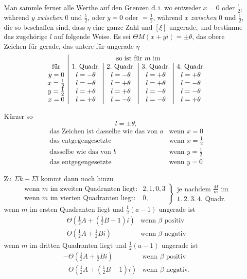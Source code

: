 Man sammle ferner alle Werthe auf den Grenzen d.\,i. wo entweder $x=0$ oder $\frac12$, während $y$ \emph{zwischen} $0$ und $\frac12$, oder $y=0$ oder $=\frac12$, während $x$ \emph{zwischen} $0$ und $\frac12$, die so beschaffen sind, dass $\eta$ eine ganze Zahl und $[\xi]$ ungerade, und bestimme das zugehörige $l$ auf folgende Weise. Es sei $\Theta M(x+yi)=\pm\theta$, das obere Zeichen für gerade, das untere für ungerade $\eta$
\[
\begin{array}{c|c|c|c|c}
&\multicolumn{4}{c}{\text{so ist für }m\text{ im}}\\
\text{für}&1.\text{ Quadr.}&2.\text{ Quadr.}&3.\text{ Quadr.}&4.\text{ Quadr.}\\
y=0&l=-\theta&l=-\theta&l=+\theta&l=+\theta\\
x=\frac12&l=-\theta&l=+\theta&l=+\theta&l=-\theta\\
y=\frac12&l=+\theta&l=+\theta&l=-\theta&l=-\theta\\
x=0&l=+\theta&l=-\theta&l=-\theta&l=+\theta
\end{array}
\]

Kürzer so
\[
l=\pm\theta,
\]
\[
\begin{array}{ll}
\text{das Zeichen ist dasselbe wie das von }a&\text{wenn }x=0\\
\text{das entgegengesetzte}&\text{wenn }x=\frac12\\
\text{dasselbe wie das von }b&\text{wenn }y=\frac12\\
\text{das entgegengesetzte}&\text{wenn }y=0
\end{array}
\]

Zu $\Sigma k+\Sigma l$ kommt dann noch hinzu
\[
\left.\begin{array}{ll}
\text{wenn }m\text{ im zweiten Quadranten liegt:}&2,1,0,3\\
\text{wenn }m\text{ im vierten Quadranten liegt:}&0,
\end{array}\right\}
\begin{array}{l}\text{je nachdem }\frac{M}{m}\text{ im}\\1.\ 2.\ 3.\ 4.\text{ Quadr.}\end{array}
\]
wenn $m$ im ersten Quadranten liegt und $\frac12(a-1)$ ungerade ist
\[
\begin{array}{ll}
\Theta(\frac12A+(\frac12B-1)i)&\text{wenn }\beta\text{ positiv}\\
\Theta(\frac12A+\frac12Bi)&\text{wenn }\beta\text{ negativ}
\end{array}
\]
wenn $m$ im dritten Quadranten liegt und $\frac12(a-1)$ ungerade ist
\[
\begin{array}{ll}
-\Theta(\frac12A+\frac12Bi)&\text{wenn }\beta\text{ positiv}\\
-\Theta(\frac12A+(\frac12B-1)i)&\text{wenn }\beta\text{ negativ.}
\end{array}
\]
